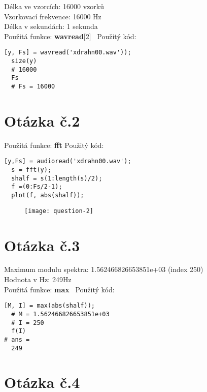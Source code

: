 \documentclass[a4paper,11pt]{article}
\begin{document}
Délka ve vzorcích: 16000 vzorků\\
Vzorkovací frekvence: 16000 Hz\\
Délka v sekundách: 1 sekunda\\
\newline
Použitá funkce: \textbf{wavread}[2]\
\newline
\newline
Použitý kód:
\lstset{language=Octave}
\begin{lstlisting}[frame=single,breaklines]
  [y, Fs] = wavread('xdrahn00.wav'));
  size(y)
  # 16000
  Fs
  # Fs = 16000
\end{lstlisting}

\section{Otázka č.2}

Použitá funkce: \textbf{fft}
\newline
\newline
Použitý kód:
\lstset{language=Matlab}
\begin{lstlisting}[frame=single,breaklines]
  [y,Fs] = audioread('xdrahn00.wav');
  s = fft(y);
  shalf = s(1:length(s)/2);
  f =(0:Fs/2-1);
  plot(f, abs(shalf));
\end{lstlisting}

\begin{figure}[h]
  \centering
  \texttt{[image: question-2]}
\end{figure}

\section{Otázka č.3}

Maximum modulu spektra: 1.562466826653851e+03 (index 250)\\
Hodnota v Hz: 249Hz\\
\newline
Použitá funkce: \textbf{max}\
\newline
\newline
Použitý kód:
\lstset{language=Matlab}
\begin{lstlisting}[frame=single,breaklines]
  [M, I] = max(abs(shalf));
  # M = 1.562466826653851e+03
  # I = 250
  f(I)
# ans =
  249
\end{lstlisting}

\section{Otázka č.4}
\end{document}
